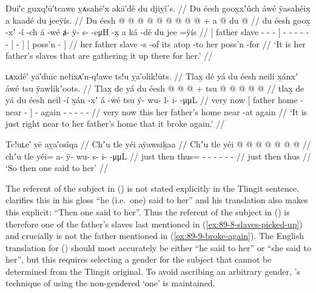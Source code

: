 \ex\label{ex:89-8-slaves-picked-up}%
%
\begingl
	\glpreamble	Duī′c guxq!ū′tcawe ỵᴀsahē′x akā′dê du djiỵîˈs. //
	\glpreamble	Du éesh goox̱xʼúch áwé ÿasahéix̱ a kaadé du jeeÿís. //
	\gla	{} Du éesh  @ {} @ {} @ {} {}
		 @ {}
		 @ {} @ {} @ {} @ {} @ {} +
		{} a  @ {} {}
		{} du  @ {} {} //
	\glb	{} du éesh goox̱ -xʼ -í -ch {}
		á -wé
		ⱥ- ÿ- s-  -eμH -x̱
		{} a ká -dé {}
		{} du jee =ÿís {} //
	\glc	{}[  father slave - - - {}]
		 -
		- - -  - -
		{}[   - {}]
		{}[  poss’n - {}] //
	\gld	{} her father slave -s -of {} {}
		 {}
		 {} {} {} {} {}
		{} its atop -to {}
		{} her poss’n -for {} //
	\glft	‘It is her father’s slaves that are gathering it up there for her.’
		//
\endgl
\xe

\ex\label{ex:89-9-broke-again}%
%
\begingl
	\glpreamble	ʟᴀxdê′ yā′duīc nełixᴀ′n-q!awe ts!u ỵa′olik!ūts. //
	\glpreamble	Tlax̱ dé yá du éesh neilí x̱ánxʼ áwé tsu ÿawlikʼoots. //
	\gla	Tlax̱ de
		{} yá du éesh  @ {}  @ {} {}
		 @ {} +
		tsu  @ {} @ {} @ {} @ {} @ {} //
	\glb	tlax̱ de
		{} yá du éesh neil -í x̱án -xʼ {}
		á -wé
		tsu ÿ- wu- l- i-  -μμL //
	\glc	very now
		{}[   father home - near - {}]
		 -
		again - - - -  - //
	\gld	very now
		{} this her father’s home {} near -at {}
		 {}
		again  {} {} {} {} {} //
	\glft	‘It is just right near to her father’s home that it broke again.’
		//
\endgl
\xe

\ex\label{ex:89-10-so-he-said-to-her}%
%
\begingl
	\glpreamble	Tc!uʟe′ yē aỵa′osîqa //
	\glpreamble	Chʼu tle yéi aÿawsiḵaa //
	\gla	Chʼu tle yéi @  @ {} @ {} @ {} @ {} @ {} @ {} //
	\glb	chʼu tle yéi= a- ÿ- wu- s- i-  -μμL //
	\glc	just then thus= - - - - -  - //
	\gld	just then thus  {} {} {} {} {} {} //
	\glft	‘So then one said to her’
		//
\endgl
\xe

The referent of the subject in (\lastx) is not stated explicitly in the Tlingit sentence.
\citeauthor{swanton:1909} clarifies this in his gloss “he (i.e.\ one) said to her” and his translation also makes this explicit: “Then one said to her”.
Thus the referent of the subject in (\lastx) is therefore one of the father’s slaves last mentioned in (\ref{ex:89-8-slaves-picked-up}) and crucially is not the father mentioned in (\ref{ex:89-9-broke-again}).
The English translation for (\lastx) should most accurately be either “he said to her” or “she said to her”, but this requires selecting a gender for the subject that cannot be determined from the Tlingit original.
To avoid ascribing an arbitrary gender, \citeauthor{swanton:1909}’s technique of using the non-gendered ‘one’ is maintained.

